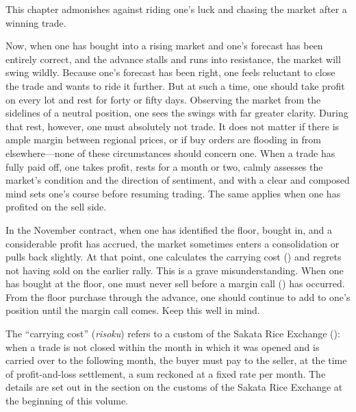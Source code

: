 \commentary
This chapter admonishes against riding one's luck and chasing the
market after a winning trade.

Now, when one has bought into a rising market and one's forecast
has been entirely correct, and the advance stalls and runs into
resistance, the market will swing wildly. Because one's forecast
has been right, one feels reluctant to close the trade and wants
to ride it further. But at such a time, one should take profit on
every lot and rest for forty or fifty days. Observing the market
from the sidelines of a neutral position, one sees the swings with
far greater clarity. During that rest, however, one must absolutely
not trade. It does not matter if there is ample margin between
regional prices, or if buy orders are flooding in from elsewhere---none of these circumstances should concern one. When a trade has
fully paid off, one takes profit, rests for a month or two, calmly
assesses the market's condition and the direction of sentiment, and
with a clear and composed mind sets one's course before resuming
trading. The same applies when one has profited on the sell side.


\begin{sokyubox}
{\small\itshape\color{sokyubar} }

\medskip
In the November contract, when one has identified the floor, bought
in, and a considerable profit has accrued, the market sometimes
enters a consolidation or pulls back slightly. At that point, one
calculates the carrying cost () and regrets not
having sold on the earlier rally. This is a grave
misunderstanding. When one has bought at the floor, one must never
sell before a margin call () has occurred. From the
floor purchase through the advance, one should continue to add to
one's position until the margin call comes. Keep this well in mind.
\end{sokyubox}

\commentary
The ``carrying cost'' (\textit{risoku}) refers to a custom of the Sakata
Rice Exchange (): when a trade is
not closed within the month in which it was opened and is carried
over to the following month, the buyer must pay to the seller, at
the time of profit-and-loss settlement, a sum reckoned at a fixed
rate per month. The details are set out in the section on the
customs of the Sakata Rice Exchange at the beginning of this
volume.

